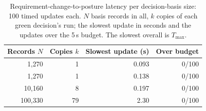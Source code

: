 \begin{table}[pos=tbp]
\centering\small
\caption{Requirement-change-to-posture latency per decision-basis size: 100 timed updates each. $N$ basis records in all, $k$ copies of each green decision's run; the slowest update in seconds and the updates over the 5\,s budget. The slowest overall is $T_{\max}$.}
\label{tab:scale-results}
\begin{tabular*}{\columnwidth}{@{\extracolsep{\fill}}rrrr@{}}
\toprule
Records $N$ & Copies $k$ & Slowest update (s) & Over budget \\
\midrule
1,270 & 1 & 0.093 & 0/100 \\
1,270 & 1 & 0.138 & 0/100 \\
10,160 & 8 & 0.197 & 0/100 \\
100,330 & 79 & 2.30 & 0/100 \\
\bottomrule
\end{tabular*}
\end{table}
